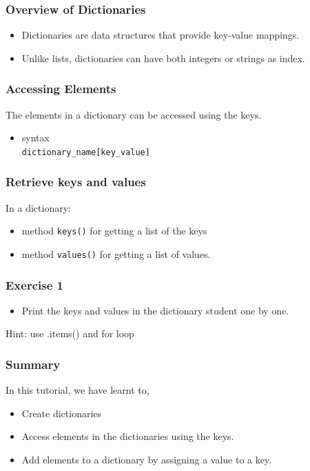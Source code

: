 \documentclass[17pt]{beamer}
\begin{document}
\begin{frame}
\frametitle{Overview of Dictionaries}
\label{sec-4}

\begin{itemize}
\item Dictionaries are data structures that provide key-value mappings. \pause

\item Unlike lists, dictionaries can have both integers or strings as index.
\end{itemize}
\end{frame}
\begin{frame}[fragile]
\frametitle{Accessing Elements}
\label{sec-5}
The elements in a dictionary can be accessed using the keys.
     \pause
\begin{itemize}
\item syntax\\
     \texttt{dictionary\_name[key\_value]}
\end{itemize}
\end{frame}
\begin{frame}[fragile]
\frametitle{Retrieve keys and values}
\label{sec-6}

In a dictionary:
\begin{itemize}
\item method \texttt{keys()} for getting a list of the keys \pause
\item method \texttt{values()} for getting a list of values.
\end{itemize}

\end{frame}
\begin{frame}
\frametitle{Exercise 1}
\label{sec-7}

\begin{itemize}
\item Print the keys and values in the dictionary student one by one.
\end{itemize}
Hint: use .items() and for loop
\end{frame}
\begin{frame}
\frametitle{Summary}
\label{sec-8.1}

  In this tutorial, we have learnt to,

\begin{itemize}
\item Create dictionaries 
\item Access elements in the dictionaries using the keys.\pause
\item Add elements to a dictionary by assigning a value to a key.
\end{itemize}
\end{frame}
\end{document}

